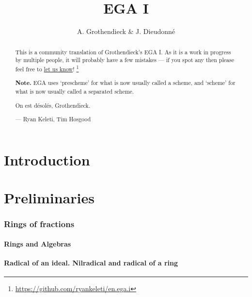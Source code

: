\documentclass[10pt,oneside]{amsart}
\title{EGA I}
\author{A. Grothendieck \& J. Dieudonn{\'e}}
\begin{document}
\renewcommand{\abstractname}{What this is}
\begin{abstract}
    This is a community translation of Grothendieck's EGA I.
    As it is a work in progress by multiple people, it will probably have a few mistakes --- if you spot any then please feel free to \href{https://github.com/ryankeleti/en.ega.i/issues}{let us know}!
    \thanks{\url{https://github.com/ryankeleti/en.ega.i}}

\noindent
    \textbf{Note.} EGA uses `prescheme' for what is now usually called
    a scheme, and `scheme' for what is now usually called a
    separated scheme.
 
    On est d{\'e}sol{\'e}s, Grothendieck.

    --- Ryan Keleti, Tim Hosgood
\end{abstract}

\maketitle

\noindent\hspace{0.15\linewidth}

{
  \tableofcontents{}
}

\clearpage

\part*{Introduction}


\clearpage

\setcounter{part}{-1}

\part{Preliminaries}

    \section{Rings of fractions}
    \setcounter{subsection}{-1}

        \subsection{Rings and Algebras}
        

        \subsection{Radical of an ideal. Nilradical and radical of a ring}
        
\end{document}
